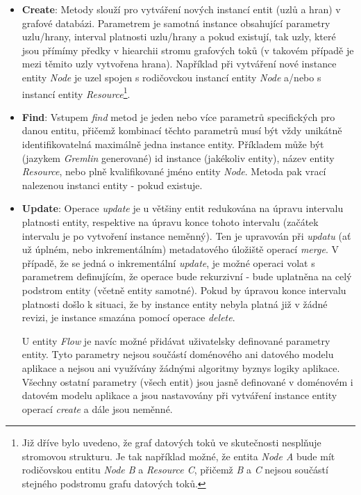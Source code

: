 \begin{itemize}
   \item{\textbf{Create}}: Metody slouží pro vytváření nových instancí entit (uzlů a hran) v grafové databázi. Parametrem je samotná instance obsahující parametry uzlu/hrany, interval platnosti uzlu/hrany a pokud existují, tak uzly, které jsou přímímy předky v hiearchii stromu grafových toků (v takovém případě je mezi těmito uzly vytvořena hrana). Například při vytváření nové instance entity \textit{Node} je uzel spojen s rodičovckou instancí entity \textit{Node} a/nebo s instancí entity \textit{Resource}\footnote{Již dříve bylo uvedeno, že graf datových toků ve skutečnosti nesplňuje stromovou strukturu. Je tak například možné, že entita \textit{Node A} bude mít rodičovskou entitu \textit{Node B} a \textit{Resource C}, přičemž \textit{B} a \textit{C} nejsou součástí stejného podstromu grafu datových toků.}.

   \item{\textbf{Find}}: Vstupem \textit{find} metod je jeden nebo více parametrů specifických pro danou entitu, přičemž kombinací těchto parametrů musí být vždy unikátně identifikovatelná maximálně jedna instance entity. Příkladem může být (jazykem \textit{Gremlin} generované) id instance (jakékoliv entity), název entity \textit{Resource}, nebo plně kvalifikované jméno entity \textit{Node}. Metoda pak vrací nalezenou instanci entity - pokud existuje.

   \item{\textbf{Update}}: Operace \textit{update} je u většiny entit redukována na úpravu intervalu platnosti entity, respektive na úpravu konce tohoto intervalu (začátek intervalu je po vytvoření instance neměnný). Ten je upravován při \textit{updatu} (ať už úplném, nebo inkrementálním) metadatového úložiště operací \textit{merge}. V případě, že se jedná o inkrementální \textit{update}, je možné operaci volat s parametrem definujícím, že operace bude rekurzivní - bude uplatněna na celý podstrom entity (včetně entity samotné). Pokud by úpravou konce intervalu platnosti došlo k situaci, že by instance entity nebyla platná již v žádné revizi, je instance smazána pomocí operace \textit{delete}.

    U entity \textit{Flow} je navíc možné přidávat uživatelsky definované parametry entity. Tyto parametry nejsou součástí doménového ani datového modelu aplikace a nejsou ani využívány žádnými algoritmy byznys logiky aplikace. Všechny ostatní parametry (všech entit) jsou jasně definované v doménovém i datovém modelu aplikace a jsou nastavovány při vytváření instance entity operací \textit{create} a dále jsou neměnné.


\end{itemize}
